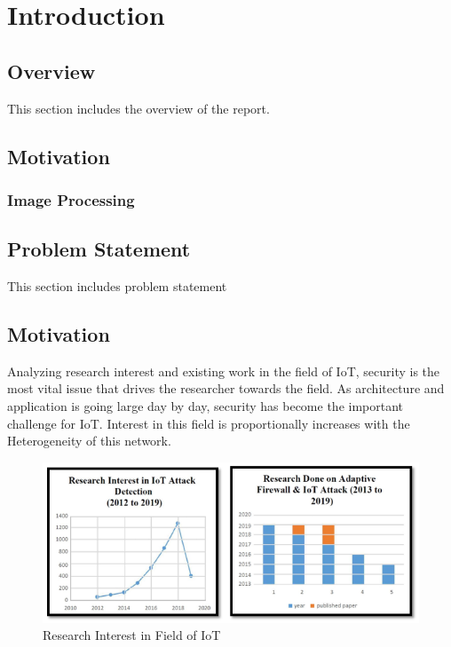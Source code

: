 

\chapter{Introduction}

\section{Overview}
This section includes the overview of the report. 

\section{Motivation}

\subsection{Image Processing}






\section{Problem Statement}
This section includes problem statement

\section{Motivation}
Analyzing research interest and existing work in the field of IoT, security is the most vital issue that drives the researcher towards the field. As architecture and application is going large day by day, security has become the important challenge for IoT. Interest in this field is proportionally increases with the Heterogeneity of this network. 

\begin{figure}
    \centering
    \includegraphics[scale=0.5]{Chap1/motivation.PNG}
    \caption{Research Interest in Field of IoT}
    \label{fig:motivation}
\end{figure}

